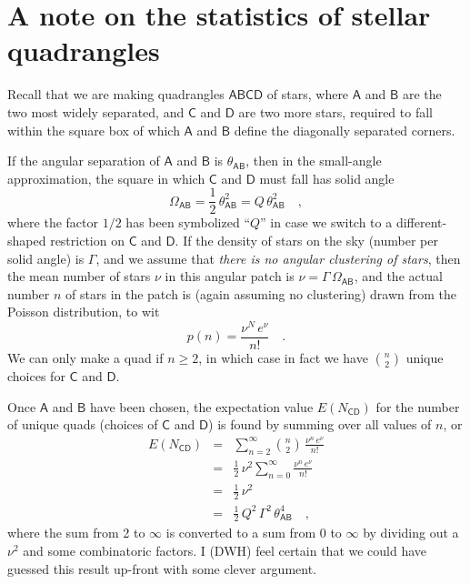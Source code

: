 \documentclass[letterpaper]{article}
\newcommand{\starlabel}[1]{\mathsf{#1}}
\newcommand{\AAA}{\starlabel{A}}
\newcommand{\BBB}{\starlabel{B}}
\newcommand{\CCC}{\starlabel{C}}
\newcommand{\DDD}{\starlabel{D}}
\newcommand{\thetaAB}{\theta_{\AAA\BBB}}
\newcommand{\OmegaAB}{\Omega_{\AAA\BBB}}
\newcommand{\ENCD}{E(N_{\CCC\DDD})}
\begin{document}
\section{A note on the statistics of stellar quadrangles}

Recall that we are making quadrangles $\AAA\BBB\CCC\DDD$ of stars,
where $\AAA$ and $\BBB$ are the two most widely separated, and $\CCC$
and $\DDD$ are two more stars, required to fall within the square box
of which $\AAA$ and $\BBB$ define the diagonally separated corners.

If the angular separation of $\AAA$ and $\BBB$ is $\thetaAB$, then in
the small-angle approximation, the square in which $\CCC$ and $\DDD$
must fall has solid angle
\begin{equation}
\OmegaAB = \frac{1}{2}\,\thetaAB^2 = Q\,\thetaAB^2 \quad ,
\end{equation}
where the factor $1/2$ has been symbolized ``$Q$'' in case we switch
to a different-shaped restriction on $\CCC$ and $\DDD$.  If the
density of stars on the sky (number per solid angle) is $\Gamma$, and
we assume that \emph{there is no angular clustering of stars}, then
the mean number of stars $\nu$ in this angular patch is
$\nu=\Gamma\,\OmegaAB$, and the actual number $n$ of stars in the
patch is (again assuming no clustering) drawn from the Poisson
distribution, to wit
\begin{equation}
p(n) = \frac{\nu^N\,e^{\nu}}{n!} \quad .
\end{equation}
We can only make a quad if $n\geq2$, in which case in fact we have
${n\choose 2}$ unique choices for $\CCC$ and $\DDD$.

Once $\AAA$ and $\BBB$ have been chosen, the expectation value $\ENCD$
for the number of unique quads (choices of $\CCC$ and $\DDD$) is found
by summing over all values of $n$, or
\begin{eqnarray}\displaystyle
\ENCD & = & \sum_{n=2}^{\infty} {n\choose 2}\,
              \frac{\nu^n\,e^{\nu}}{n!} \\
      & = & \frac{1}{2}\,\nu^2 \sum_{n=0}^{\infty} 
              \frac{\nu^n\,e^{\nu}}{n!} \\
      & = & \frac{1}{2}\,\nu^2 \\
      & = & \frac{1}{2}\,Q^2\,\Gamma^2\,\thetaAB^4 \quad ,
\end{eqnarray}
where the sum from 2 to $\infty$ is converted to a sum from 0 to
$\infty$ by dividing out a $\nu^2$ and some combinatoric factors.  I
(DWH) feel certain that we could have guessed this result up-front
with some clever argument.
\end{document}
